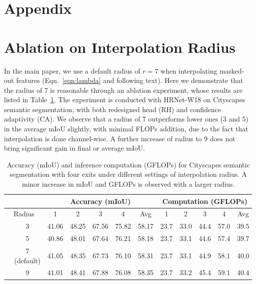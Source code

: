 

\def\httilde{\mbox{\tt\raisebox{-.5ex}{\symbol{126}}}}


\vskip 0.3in


\section*{\LARGE{Appendix}}
\maketitle


\section{Ablation on Interpolation Radius}
In the main paper, we use a default radius of $r=7$ when interpolating masked-out features (Eqn.~\ref{eqn:lambda} and following text). Here we demonstrate that the radius of 7 is reasonable through an ablation experiment, whose results are listed in Table~\ref{tab:radius}. The experiment is conducted with HRNet-W18 on Cityscapes semantic segmentation, with both redesigned head (RH) and confidence adaptivity (CA). We observe that a radius of 7 outperforms lower ones (3 and 5) in the average mIoU slightly, with minimal FLOPs addition, due to the fact that interpolation is done channel-wise. A further increase of radius to 9 does not bring significant gain in final or average mIoU.
\begin{table}[h]
\vspace{0ex}
\centering
\footnotesize
\begin{tabular}{cc|ccccc|ccccc}
\hline
\multicolumn{2}{c|}{}                            & \multicolumn{5}{c}{Accuracy (mIoU)}         & \multicolumn{5}{|c}{Computation (GFLOPs)}            \\ \hline
\multicolumn{2}{c|}{Radius}             & 1    & 2    & 3    & 4    & Avg  & 1     & 2     & 3     & 4      & Avg   \\ \hline
& 3 & 41.06 &	48.25 &	67.56 &	75.82  & 58.17  &  23.7 &  33.0 & 44.4 & 57.0 &   39.5  \\ 
& 5 & 40.86 &	48.01 &	67.64 &	76.21  & 58.18  &  23.7 & 33.1 & 44.6 & 57.4 &   39.7  \\ 
& 7 (default) & 41.05 &	48.35 &	67.73 &	76.10  & 58.31  & 23.7 & 33.1 & 44.9 & 58.1 &   40.0  \\ 
& 9 & 41.01 &	48.41 &	67.88 &	76.08 & 58.35  &  23.7 & 33.2 & 45.4 & 59.1 &   40.4  \\  \hline
\end{tabular}
\vspace{0ex}
\caption{%
Accuracy (mIoU) and inference computation (GFLOPs) for Cityscapes semantic segmentation with four exits under different settings of interpolation radius. A minor increase in mIoU and GFLOPs is observed with a larger radius.
}
\vspace{-1ex}
\label{tab:radius}
\end{table}

